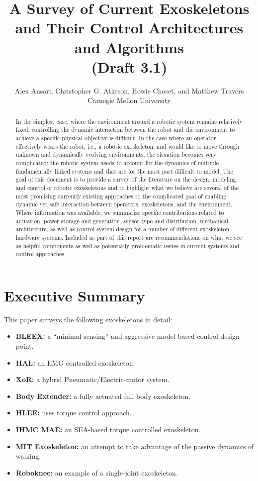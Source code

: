 \documentclass[letterpaper,12pt,fullpage]{article}
\begin{document}
\title{A Survey of Current Exoskeletons and Their Control Architectures and
Algorithms\\
(Draft 3.1)}

\author{Alex Ansari, Christopher G. Atkeson, Howie Choset, and Matthew Travers\\
Carnegie Mellon University}

\maketitle

\begin{abstract}
In the simplest case, where the environment around a robotic system remains relatively fixed, controlling the dynamic interaction between the robot and the environment to achieve a specific physical objective is difficult.  In the case where an operator effectively wears the robot, i.e., a robotic exoskeleton, and would like to move through unknown and dynamically evolving environments, the situation becomes very complicated; the robotic system needs to account for the dynamics of multiple fundamentally linked systems and that are for the most part difficult to model.  The goal of this document is to provide a survey of the literature on the design, modeling, and control of robotic exoskeletons and to highlight what we believe are several of the most promising currently existing approaches to the complicated goal of enabling dynamic yet safe interaction between operators, exoskeletons, and the environment.  Where information was available, we summarize specific contributions related to actuation, power storage and generation, sensor type and distribution, mechanical architecture, as well as control system design for a number of different exoskeleton hardware systems.  Included as part of this report are recommendations on what we see as helpful components as well as potentially problematic issues in current systems and control approaches. 
\end{abstract}

\section{Executive Summary}

This paper surveys the following exoskeletons in detail:
\begin{itemize}
\item
{\bf BLEEX:} a ``minimal-sensing'' and aggressive model-based control design point.
\item
{\bf HAL:} an EMG controlled exoskeleton.
\item
{\bf XoR:} a hybrid Pneumatic/Electric-motor system.
\item
{\bf Body Extender:} a fully actuated full body exoskeleton.
\item
{\bf HLEE:} uses torque control approach.
\item
{\bf IHMC MAE:} an SEA-based torque controlled exoskeleton.
\item
{\bf MIT Exoskeleton:} an attempt to take advantage of the passive dynamics
of walking.
\item
{\bf Roboknee:} an example of a single-joint exoskeleton.
\end{itemize}
\end{document}
